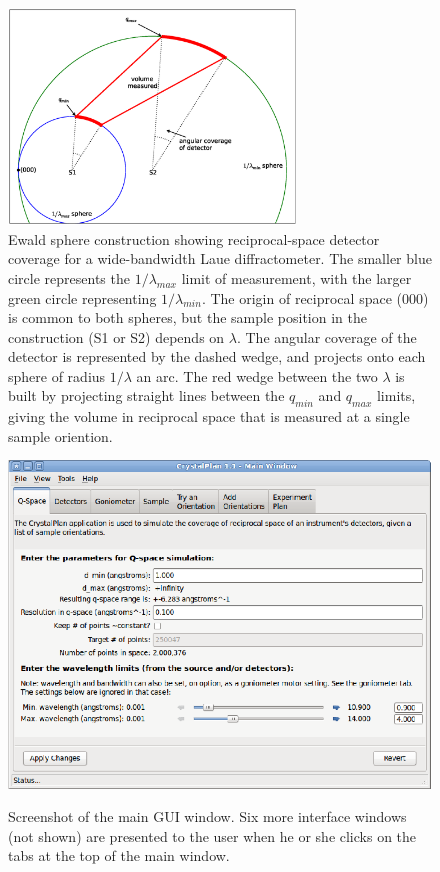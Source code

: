 \documentclass[final]{iucr}              %
\begin{document}
\begin{figure}
\caption{Ewald sphere construction showing reciprocal-space detector coverage
for a wide-bandwidth Laue diffractometer. The smaller blue circle represents the
$1/\lambda_{max}$ limit of measurement, with the larger green circle
representing $1/\lambda_{min}$. The origin of reciprocal space (000) is common to both
spheres, but the sample position in the construction (S1 or S2) depends on
$\lambda$. The angular coverage of the detector is represented by the dashed
wedge, and projects onto each sphere of radius $1/\lambda$ an arc. The red wedge
between the two $\lambda$ is built by projecting straight lines between the
$q_{min}$ and $q_{max}$ limits, giving the volume in reciprocal space that is
measured at a single sample oriention. }

\includegraphics[width=3in]{ewald_fig.ps}  
    
\label{fig:ewald_fig} 
\end{figure} 
 
  
\begin{figure}
\caption{Screenshot of the main GUI window. Six more interface windows (not
shown) are presented to the user when he or she clicks on the tabs at the
top of the main window.}
\includegraphics{main_gui.eps}
\label{fig:screenshots}
\end{figure}
 
\end{document}
